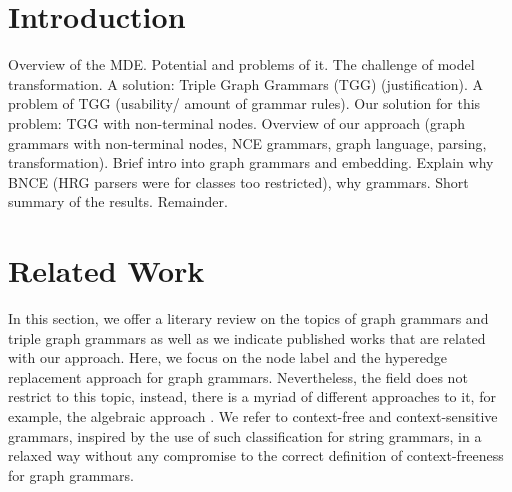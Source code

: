 \documentclass[]{report}
\title{}
\author{William Bombardelli da Silva}
\begin{document}
\maketitle

\begin{abstract}
\end{abstract}

\tableofcontents
\newpage

\section{Introduction}
Overview of the MDE. Potential and problems of it. The challenge of model transformation. A solution: Triple Graph Grammars (TGG) (justification). A problem of TGG (usability/ amount of grammar rules). Our solution for this problem: TGG with non-terminal nodes. Overview of our approach (graph grammars with non-terminal nodes, NCE grammars, graph language, parsing, transformation). Brief intro into graph grammars and embedding. Explain why BNCE (HRG parsers were for classes too restricted), why grammars. Short summary of the results. Remainder.


\section{Related Work}
In this section, we offer a literary review on the topics of graph grammars and triple graph grammars as well as we indicate published works that are related with our approach. Here, we focus on the node label and the hyperedge replacement approach for graph grammars. Nevertheless, the field does not restrict to this topic, instead, there is a myriad of different approaches to it, for example, the algebraic approach \cite{ehrig1999handbook}. We refer to context-free and context-sensitive grammars, inspired by the use of such classification for string grammars, in a relaxed way without any compromise to the correct definition of context-freeness for graph grammars.
\end{document}

